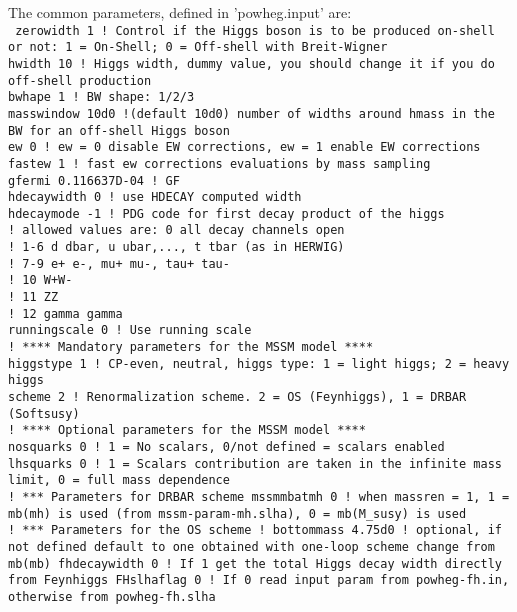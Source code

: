 \documentclass[paper]{JHEP3}
\begin{document}
The  common parameters, defined in 'powheg.input' are: \\
{\tt
zerowidth 1 ! Control if the Higgs boson is to be produced on-shell or not: 1 = On-Shell; 0 = Off-shell with Breit-Wigner\\
hwidth 10   ! Higgs width, dummy value, you should change it if you do off-shell production\\
bwhape 1       ! BW shape: 1/2/3\\
masswindow 10d0  !(default 10d0) number of widths around hmass in the BW for an off-shell Higgs boson\\
ew 0                     ! ew = 0 disable EW corrections, ew = 1 enable EW corrections\\
fastew 1                   ! fast ew corrections evaluations by mass sampling\\
gfermi 0.116637D-04        ! GF\\
hdecaywidth 0   ! use HDECAY computed width\\
hdecaymode -1      ! PDG code for first decay product of the higgs\\
! allowed values are:  0 all decay channels open\\
!                      1-6 d dbar, u ubar,..., t tbar (as in HERWIG)\\
!                      7-9 e+ e-, mu+ mu-, tau+ tau-\\
!                      10  W+W-\\
!                      11  ZZ\\
!                      12  gamma gamma\\
runningscale 0 ! Use running scale\\
! **** Mandatory parameters for the MSSM model ****\\
higgstype 1 ! CP-even, neutral, higgs type: 1 = light higgs; 2 = heavy higgs\\
scheme 2    ! Renormalization scheme. 2 = OS (Feynhiggs), 1 = DRBAR (Softsusy)\\ 
! **** Optional parameters for the MSSM model  ****\\
nosquarks 0 ! 1 = No scalars, 0/not defined = scalars enabled\\
lhsquarks 0 ! 1 = Scalars contribution are taken in the infinite mass limit, 0 = full mass dependence\\
! *** Parameters for DRBAR scheme
mssmmbatmh 0 ! when massren = 1, 1 = mb(mh) is used (from mssm-param-mh.slha), 0 = mb(M\_susy) is used\\
! *** Parameters for the OS scheme
! bottommass 4.75d0 ! optional, if not defined default to one obtained with one-loop scheme change from mb(mb)
fhdecaywidth 0 ! If 1 get the total Higgs decay width directly from Feynhiggs
FHslhaflag 0  ! If 0 read input param from powheg-fh.in, otherwise from powheg-fh.slha\\
}
\end{document}
